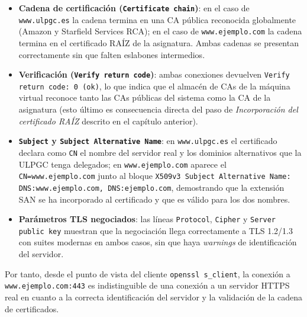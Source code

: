 \begin{itemize}
    \item \textbf{Cadena de certificación (\texttt{Certificate chain})}: en el caso de \texttt{www.ulpgc.es} la cadena termina en una CA pública reconocida globalmente (Amazon y Starfield Services RCA); en el caso de \texttt{www.ejemplo.com} la cadena termina en el certificado RAÍZ de la asignatura. Ambas cadenas se presentan correctamente sin que falten eslabones intermedios.
    \item \textbf{Verificación (\texttt{Verify return code})}: ambas conexiones devuelven \texttt{Verify return code: 0 (ok)}, lo que indica que el almacén de CAs de la máquina virtual reconoce tanto las CAs públicas del sistema como la CA de la asignatura (esto último es consecuencia directa del paso de \emph{Incorporación del certificado RAÍZ} descrito en el capítulo anterior).
    \item \textbf{\texttt{Subject} y \texttt{Subject Alternative Name}}: en \texttt{www.ulpgc.es} el certificado declara como \texttt{CN} el nombre del servidor real y los dominios alternativos que la ULPGC tenga delegados; en \texttt{www.ejemplo.com} aparece el \texttt{CN=www.ejemplo.com} junto al bloque \texttt{X509v3 Subject Alternative Name: DNS:www.ejemplo.com, DNS:ejemplo.com}, demostrando que la extensión SAN se ha incorporado al certificado y que es válido para los dos nombres.
    \item \textbf{Parámetros TLS negociados}: las líneas \texttt{Protocol}, \texttt{Cipher} y \texttt{Server public key} muestran que la negociación llega correctamente a TLS 1.2/1.3 con suites modernas en ambos casos, sin que haya \emph{warnings} de identificación del servidor.
\end{itemize}

Por tanto, desde el punto de vista del cliente \texttt{openssl s\_client}, la conexión a \texttt{www.ejemplo.com:443} es indistinguible de una conexión a un servidor HTTPS real en cuanto a la correcta identificación del servidor y la validación de la cadena de certificados.
